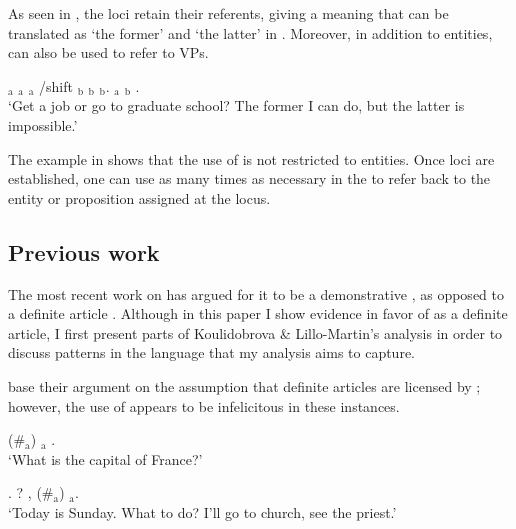 \documentclass[output=paper,
modfonts
]{langscibook}
\begin{document}
As seen in , the loci retain their referents, giving a meaning that can be translated as `the former' and `the latter' in . Moreover, in addition to entities,  can also be used to refer to VPs.

\begin{exe}  
\setcounter{xnumi}{2}
\ex {}$_\text{a}$ $_\text{a}$ $_\text{a}$ /shift $_\text{b}$ $_\text{b}$ $_\text{b}$. $_\text{a}$   $_\text{b}$ \newline {}.\\
`Get a job or go to graduate school? The former I can do, but the latter is impossible.’ \citep[226]{KoulidobrovaLilloMartin2016} \label{ex:irani:3}
\end{exe}

The example in  shows that the use of  is not restricted to entities. Once loci are established, one can use  as many times as necessary in the  to refer back to the entity or proposition assigned at the locus.

\subsection{Previous work}

The most recent work on  has argued for it to be a demonstrative \citep{KoulidobrovaLilloMartin2016}, as opposed to a definite article \citep{Bahanetal1995}. Although in this paper I show evidence in favor of  as a definite article, I first present parts of Koulidobrova \& Lillo-Martin's analysis in order to discuss patterns in the language that my analysis aims to capture.

\citet{KoulidobrovaLilloMartin2016} base their argument on the assumption that definite articles are licensed by ; however, the use of  appears to be infelicitous in these instances.

\begin{exe}
\ex \label{ex:irani:4}  (\#$_\text{a}$) $_\text{a}$ . \\
`What is the capital of France?’ \citep[234]{KoulidobrovaLilloMartin2016}
\end{exe}

\begin{exe}                                                   
\ex \label{ex:irani:5}  . ?  ,  (\#$_\text{a}$) $_\text{a}$.\\
`Today is Sunday. What to do? I’ll go to church, see the priest.' \\ \citep[234]{KoulidobrovaLilloMartin2016}
\end{exe}
\end{document}
